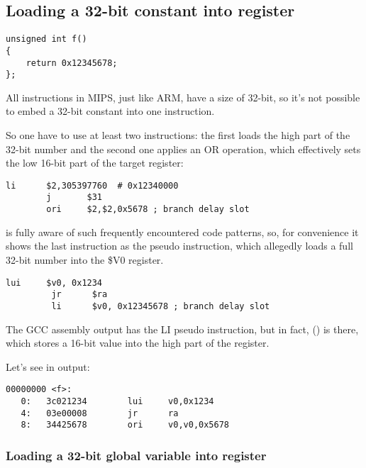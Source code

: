 ﻿\subsection{Loading a 32-bit constant into register}
\label{MIPS_big_constants}

\begin{lstlisting}[style=customc]
unsigned int f()
{
	return 0x12345678;
};
\end{lstlisting}

All instructions in MIPS, just like ARM, have a size of 32-bit, so it's not possible to
embed a 32-bit constant into one instruction.

So one have to use at least two instructions: 
the first loads the high part of the 32-bit number and the second
one applies an OR operation, which effectively sets the low 16-bit part of the target register:

\begin{lstlisting}[caption=GCC 4.4.5 -O3 (\assemblyOutput),style=customasmMIPS]
        li      $2,305397760  # 0x12340000
        j       $31
        ori     $2,$2,0x5678 ; branch delay slot
\end{lstlisting}

\IDA is fully aware of such frequently encountered code patterns, 
so, for convenience it shows the last  instruction as the  pseudo instruction,
which allegedly loads a full 32-bit number into the \$V0 register.


\begin{lstlisting}[caption=GCC 4.4.5 -O3 (IDA),style=customasmMIPS]
         lui     $v0, 0x1234
         jr      $ra
         li      $v0, 0x12345678 ; branch delay slot
\end{lstlisting}

The GCC assembly output has the LI pseudo instruction, but in fact,  () is there,
which stores a 16-bit value into the high part of the register.

Let's see in  output:

\begin{lstlisting}[caption=objdump,style=customasmMIPS]
00000000 <f>:
   0:   3c021234        lui     v0,0x1234
   4:   03e00008        jr      ra
   8:   34425678        ori     v0,v0,0x5678
\end{lstlisting}

\subsubsection{Loading a 32-bit global variable into register}

